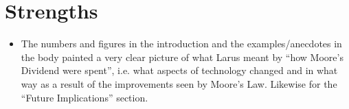 \documentclass [12pt]{article}
\begin{document}
        
        
        
        


    \section{Strengths} %
    \label{sec:strengths}
        \begin{itemize}
            \item The numbers and figures in the introduction and the examples/anecdotes in the body painted a very clear picture of what Larus meant by ``how Moore's Dividend were spent'', i.e. what aspects of technology changed and in what way as a result of the improvements seen by Moore's Law. Likewise for the ``Future Implications'' section.
        \end{itemize}
\end{document}
